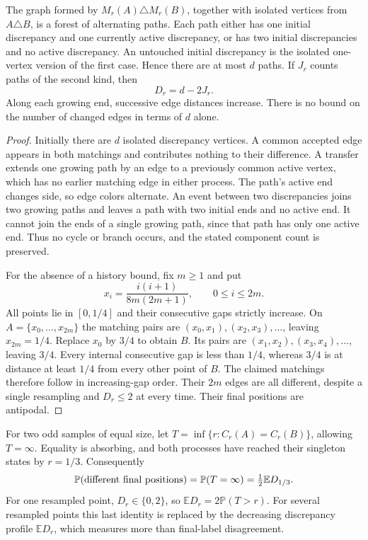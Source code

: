 \documentclass[11pt,letterpaper]{article}
\newcommand{\PP}{\mathbb P}\newcommand{\EE}{\mathbb E}
\begin{document}
\begin{proposition}
\label{prop:edit-forest}
The graph formed by $M_r(A)\triangle M_r(B)$, together with isolated
vertices from $A\triangle B$, is a forest of alternating paths.
Each path either has one initial discrepancy and one currently
active discrepancy, or has two initial discrepancies and no active
discrepancy. An untouched initial discrepancy is the isolated
one-vertex version of the first case. Hence there are at most $d$
paths. If $J_r$ counts paths of the second kind, then
\[
 D_r=d-2J_r.
\]
Along each growing end, successive edge distances increase.
There is no bound on the number of changed edges in terms of $d$
alone.
\end{proposition}
\begin{proof}
Initially there are $d$ isolated discrepancy vertices. A common
accepted edge appears in both matchings and contributes nothing
to their difference. A transfer extends one growing path by an
edge to a previously common active vertex, which has no earlier
matching edge in either process. The path's active end changes
side, so edge colors alternate. An event between two discrepancies
joins two growing paths and leaves a path with two initial ends
and no active end. It cannot join the ends of a single growing
path, since that path has only one active end. Thus no cycle or
branch occurs, and the stated component count is preserved.

For the absence of a history bound, fix $m\ge1$ and put
\[
 x_i=\frac{i(i+1)}{8m(2m+1)},\qquad 0\le i\le2m.
\]
All points lie in $[0,1/4]$ and their consecutive gaps strictly
increase. On $A=\{x_0,\ldots,x_{2m}\}$ the matching pairs are
$(x_0,x_1),(x_2,x_3),\ldots$, leaving $x_{2m}=1/4$.
Replace $x_0$ by $3/4$ to obtain $B$. Its pairs are
$(x_1,x_2),(x_3,x_4),\ldots$, leaving $3/4$.
Every internal consecutive gap is less than $1/4$, whereas
$3/4$ is at distance at least $1/4$ from every other point of $B$.
The claimed matchings therefore follow in increasing-gap order.
Their $2m$ edges are all different, despite a single resampling
and $D_r\le2$ at every time. Their final positions are antipodal.
\end{proof}

For two odd samples of equal size, let
$T=\inf\{r:C_r(A)=C_r(B)\}$, allowing $T=\infty$. Equality is
absorbing, and both processes have reached their singleton states
by $r=1/3$. Consequently
\begin{equation}\label{eq:coalescence-noise}
 \PP(\hbox{different final positions})
    =\PP(T=\infty)=\tfrac12\EE D_{1/3}.
\end{equation}
For one resampled point, $D_r\in\{0,2\}$, so
$\EE D_r=2\PP(T>r)$. For several resampled points this last
identity is replaced by the decreasing discrepancy profile
$\EE D_r$, which measures more than final-label disagreement.
\end{document}
